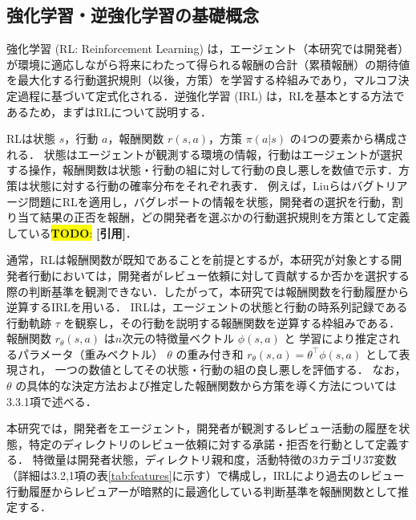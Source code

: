 \documentclass[submit,noauthor,ses,dvipdfmx]{ipsj}
\newcommand{\todo}[1]{\colorbox{yellow}{{\bf TODO}:}{\color{red} {\textbf{[#1]}}}}
\begin{document}


\subsection{強化学習・逆強化学習の基礎概念}

強化学習 (RL: Reinforcement Learning) は，エージェント（本研究では開発者）が環境に適応しながら将来にわたって得られる報酬の合計（累積報酬）の期待値を最大化する行動選択規則（以後，方策）を学習する枠組みであり，マルコフ決定過程に基づいて定式化される．逆強化学習 (IRL) は，RLを基本とする方法であるため，まずはRLについて説明する．

RLは状態 $s$，行動 $a$，報酬関数 $r(s, a)$，方策 $\pi(a|s)$ の4つの要素から構成される．
状態はエージェントが観測する環境の情報，行動はエージェントが選択する操作，報酬関数は状態・行動の組に対して行動の良し悪しを数値で示す．方策は状態に対する行動の確率分布をそれぞれ表す．
例えば，Liuらはバグトリアージ問題にRLを適用し，バグレポートの情報を状態，開発者の選択を行動，割り当て結果の正否を報酬，どの開発者を選ぶかの行動選択規則を方策として定義している\todo{引用}．

通常，RLは報酬関数が既知であることを前提とするが，本研究が対象とする開発者行動においては，開発者がレビュー依頼に対して貢献するか否かを選択する際の判断基準を観測できない．したがって，本研究では報酬関数を行動履歴から逆算するIRLを用いる．
IRLは，エージェントの状態と行動の時系列記録である行動軌跡 $\tau$ を観察し，その行動を説明する報酬関数を逆算する枠組みである．
報酬関数 $r_\theta(s,a)$ は$n$次元の特徴量ベクトル $\phi(s, a)$ と
学習により推定されるパラメータ（重みベクトル） $\theta$ の重み付き和
$r_\theta(s,a) = \theta^\top \phi(s,a)$ として表現され，
一つの数値としてその状態・行動の組の良し悪しを評価する．
なお，$\theta$ の具体的な決定方法および推定した報酬関数から方策を導く方法については3.3.1項で述べる．

本研究では，開発者をエージェント，開発者が観測するレビュー活動の履歴を状態，特定のディレクトリのレビュー依頼に対する承諾・拒否を行動として定義する．
特徴量は開発者状態，ディレクトリ親和度，活動特徴の3カテゴリ37変数（詳細は3.2,1項の表\ref{tab:features}に示す）で構成し，IRLにより過去のレビュー行動履歴からレビュアーが暗黙的に最適化している判断基準を報酬関数として推定する．
\end{document}
